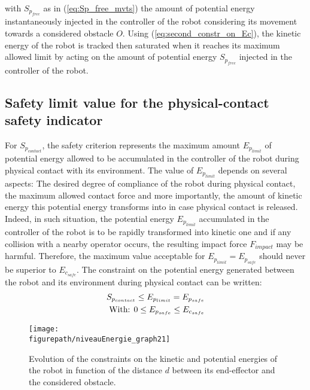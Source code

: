 with $S_{p_{free}}$ as in (\ref{eq:Sp_free_mvts}) the amount of potential energy instantaneously injected in the controller of the robot considering its movement towards a considered obstacle $O$. Using (\ref{eq:second_constr_on_Ec}), the kinetic energy of the robot is tracked then saturated when it reaches its maximum allowed limit by acting on the amount of potential energy $S_{p_{free}}$ injected in the controller of the robot. 
\subsection{Safety limit value for the physical-contact safety indicator}
For $S_{p_{contact}}$, the safety criterion represents the maximum amount $E_{p_{limit}}$ of potential energy allowed to be accumulated in the controller of the robot during physical contact with its environment. The value of $E_{p_{limit}}$ depends on several aspects: The desired degree of compliance of the robot during physical contact, the maximum allowed contact force and more importantly, the amount of kinetic energy this potential energy transforms into in case physical contact is released. Indeed, in such situation, the potential energy $E_{p_{limit}}$ accumulated in the controller of the robot is to be rapidly transformed into kinetic one and if any collision with a nearby operator occurs, the resulting impact force $F_{impact}$ may be harmful. Therefore, the maximum value acceptable for $E_{p_{limit}} = E_{p_{safe}}$ should never be superior to $E_{c_{safe}}$. The constraint on the potential energy generated between the robot and its environment during physical contact can be written: 
\begin{equation}
\begin{split}
S_{p_{contact}} \leq E_{p_{limit}} = E_{p_{safe}} \\
\textnormal{With: }
0 \leq E_{p_{safe}} \leq E_{c_{safe}}
\end{split}
\label{eq:Ep_constr_a}
\end{equation}
\begin{figure}
    \centering
	\texttt{[image: \\figurepath/niveauEnergie\_graph21]}
    \caption{Evolution of the constraints on the kinetic and potential energies of the robot in function of the distance $d$ between its end-effector and the considered obstacle.}
    \label{fig:niveauEnergie21}
\end{figure}
